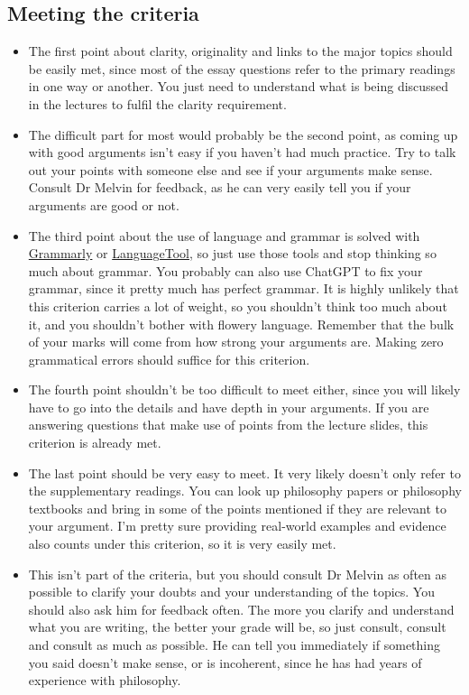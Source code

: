 \documentclass[11pt]{article}
\begin{document}
\subsection{Meeting the criteria}
\label{sec:orgb5a809b}
\begin{itemize}
\item The first point about clarity, originality and links to the major topics should be easily met, since most of the essay questions refer to the primary readings in one way or another. You just need to understand what is being discussed in the lectures to fulfil the clarity requirement.
\item The difficult part for most would probably be the second point, as coming up with good arguments isn't easy if you haven't had much practice. Try to talk out your points with someone else and see if your arguments make sense. Consult Dr Melvin for feedback, as he can very easily tell you if your arguments are good or not.
\item The third point about the use of language and grammar is solved with \href{https://www.grammarly.com/}{Grammarly} or \href{https://languagetool.org/}{LanguageTool}, so just use those tools and stop thinking so much about grammar. You probably can also use ChatGPT to fix your grammar, since it pretty much has perfect grammar. It is highly unlikely that this criterion carries a lot of weight, so you shouldn't think too much about it, and you shouldn't bother with flowery language. Remember that the bulk of your marks will come from how strong your arguments are. Making zero grammatical errors should suffice for this criterion.
\item The fourth point shouldn't be too difficult to meet either, since you will likely have to go into the details and have depth in your arguments. If you are answering questions that make use of points from the lecture slides, this criterion is already met.
\item The last point should be very easy to meet. It very likely doesn't only refer to the supplementary readings. You can look up philosophy papers or philosophy textbooks and bring in some of the points mentioned if they are relevant to your argument. I'm pretty sure providing real-world examples and evidence also counts under this criterion, so it is very easily met.
\item This isn't part of the criteria, but you should consult Dr Melvin as often as possible to clarify your doubts and your understanding of the topics. You should also ask him for feedback often. The more you clarify and understand what you are writing, the better your grade will be, so just consult, consult and consult as much as possible. He can tell you immediately if something you said doesn't make sense, or is incoherent, since he has had years of experience with philosophy.
\end{itemize}
\end{document}
